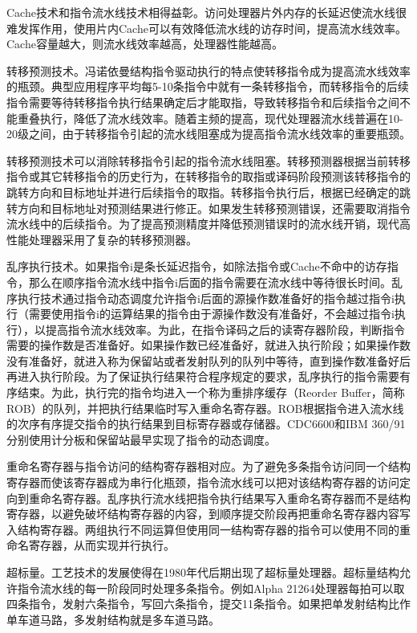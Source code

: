 \documentclass[]{ctexbook}
\begin{document}
Cache技术和指令流水线技术相得益彰。访问处理器片外内存的长延迟使流水线很难发挥作用，使用片内Cache可以有效降低流水线的访存时间，提高流水线效率。Cache容量越大，则流水线效率越高，处理器性能越高。

转移预测技术。冯诺依曼结构指令驱动执行的特点使转移指令成为提高流水线效率的瓶颈。典型应用程序平均每5-10条指令中就有一条转移指令，而转移指令的后续指令需要等待转移指令执行结果确定后才能取指，导致转移指令和后续指令之间不能重叠执行，降低了流水线效率。随着主频的提高，现代处理器流水线普遍在10-20级之间，由于转移指令引起的流水线阻塞成为提高指令流水线效率的重要瓶颈。

转移预测技术可以消除转移指令引起的指令流水线阻塞。转移预测器根据当前转移指令或其它转移指令的历史行为，在转移指令的取指或译码阶段预测该转移指令的跳转方向和目标地址并进行后续指令的取指。转移指令执行后，根据已经确定的跳转方向和目标地址对预测结果进行修正。如果发生转移预测错误，还需要取消指令流水线中的后续指令。为了提高预测精度并降低预测错误时的流水线开销，现代高性能处理器采用了复杂的转移预测器。

乱序执行技术。如果指令i是条长延迟指令，如除法指令或Cache不命中的访存指令，那么在顺序指令流水线中指令i后面的指令需要在流水线中等待很长时间。乱序执行技术通过指令动态调度允许指令i后面的源操作数准备好的指令越过指令i执行（需要使用指令i的运算结果的指令由于源操作数没有准备好，不会越过指令i执行），以提高指令流水线效率。为此，在指令译码之后的读寄存器阶段，判断指令需要的操作数是否准备好。如果操作数已经准备好，就进入执行阶段；如果操作数没有准备好，就进入称为保留站或者发射队列的队列中等待，直到操作数准备好后再进入执行阶段。为了保证执行结果符合程序规定的要求，乱序执行的指令需要有序结束。为此，执行完的指令均进入一个称为重排序缓存（Reorder Buffer，简称ROB）的队列，并把执行结果临时写入重命名寄存器。ROB根据指令进入流水线的次序有序提交指令的执行结果到目标寄存器或存储器。CDC6600和IBM 360/91分别使用计分板和保留站最早实现了指令的动态调度。

重命名寄存器与指令访问的结构寄存器相对应。为了避免多条指令访问同一个结构寄存器而使该寄存器成为串行化瓶颈，指令流水线可以把对该结构寄存器的访问定向到重命名寄存器。乱序执行流水线把指令执行结果写入重命名寄存器而不是结构寄存器，以避免破坏结构寄存器的内容，到顺序提交阶段再把重命名寄存器内容写入结构寄存器。两组执行不同运算但使用同一结构寄存器的指令可以使用不同的重命名寄存器，从而实现并行执行。

超标量。工艺技术的发展使得在1980年代后期出现了超标量处理器。超标量结构允许指令流水线的每一阶段同时处理多条指令。例如Alpha 21264处理器每拍可以取四条指令，发射六条指令，写回六条指令，提交11条指令。如果把单发射结构比作单车道马路，多发射结构就是多车道马路。
\end{document}
